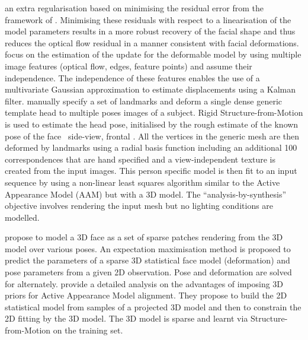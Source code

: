 an extra regularisation based on minimising the residual error from the
framework of \citet{decarlo2000optical}. Minimising these residuals with respect
to a linearisation of the model parameters results in a more robust recovery of
the facial shape and thus reduces the optical flow residual in a manner
consistent with facial deformations.
\citet{goldenstein2004facial} focus on the estimation of the update for
the deformable model by using multiple image features (optical flow,
edges, feature points) and assume their independence. The independence
of these features enables the use of a multivariate Gaussian approximation
to estimate displacements using a Kalman filter.
\citet{pighin2002modeling} manually specify a set of landmarks and deform
a single dense generic template head to multiple poses images of a subject. 
Rigid Structure-from-Motion is used to estimate the head pose, initialised
by the rough estimate of the known pose of the face \eg~side-view, frontal \etc.
All the vertices in the generic mesh are then deformed by landmarks
using a radial basis function including an additional 100 correspondences
that are hand specified and a view-independent texture is created from the input
images. This person specific model is then fit to an input
sequence by using a non-linear least squares algorithm similar to the Active
Appearance Model (AAM) but with a 3D model. The ``analysis-by-synthesis''
objective involves rendering the input mesh but no lighting conditions are
modelled.

\citet{lie2006alignment} propose to model a 3D face as a set of sparse patches
rendering from the 3D model over various poses. An expectation maximisation
method is proposed to predict the parameters of a sparse 3D statistical face
model (deformation) and pose parameters from a given 2D observation. Pose
and deformation are solved for alternately.
\cite{Matthews:2007gb} provide a detailed analysis on the advantages
of imposing 3D priors for Active Appearance Model alignment. They propose to
build the 2D statistical model from samples of a projected 3D model and then
to constrain the 2D fitting by the 3D model. The 3D model is sparse and learnt
via Structure-from-Motion on the training set.

